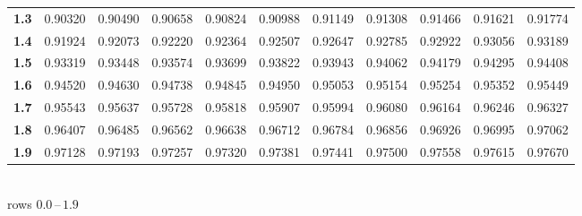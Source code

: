 \begin{minipage}[t]{0.49\textwidth}
{\begin{tabular}{@{}r|*{10}{c}@{}}
    \textbf{1.3} & 0.90320 & 0.90490 & 0.90658 & 0.90824 & 0.90988 & 0.91149 & 0.91308 & 0.91466 & 0.91621 & 0.91774 \\
    \textbf{1.4} & 0.91924 & 0.92073 & 0.92220 & 0.92364 & 0.92507 & 0.92647 & 0.92785 & 0.92922 & 0.93056 & 0.93189 \\
    \textbf{1.5} & 0.93319 & 0.93448 & 0.93574 & 0.93699 & 0.93822 & 0.93943 & 0.94062 & 0.94179 & 0.94295 & 0.94408 \\
    \textbf{1.6} & 0.94520 & 0.94630 & 0.94738 & 0.94845 & 0.94950 & 0.95053 & 0.95154 & 0.95254 & 0.95352 & 0.95449 \\
    \textbf{1.7} & \cellcolor{purple!22}0.95543 & 0.95637 & 0.95728 & 0.95818 & 0.95907 & 0.95994 & 0.96080 & 0.96164 & 0.96246 & 0.96327 \\
    \textbf{1.8} & 0.96407 & 0.96485 & 0.96562 & 0.96638 & 0.96712 & 0.96784 & 0.96856 & 0.96926 & 0.96995 & 0.97062 \\
    \textbf{1.9} & 0.97128 & 0.97193 & 0.97257 & 0.97320 & 0.97381 & 0.97441 & 0.97500 & 0.97558 & 0.97615 & 0.97670 \\
    \bottomrule
\end{tabular}%
}\\[0.35em]
{\footnotesize rows $0.0$\,--\,$1.9$}
\end{minipage}%
\hfill
